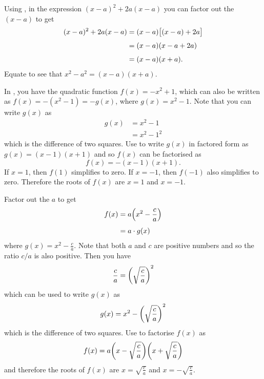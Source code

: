 \documentclass[a4paper,oneside,12pt]{article}
\begin{document}
\begin{problem}
{\begin{solution}
Using , in
the expression $(x - a)^2 + 2a(x - a)$ you can factor out the
$(x - a)$ to get
\begin{equation}
\label{eqn:quadroots:difference_two_squares_factorised}
\begin{aligned}
(x - a)^2 + 2a(x - a)
&=
(x - a) \bigsquare{(x - a) + 2a} \\[4pt]
&=
(x - a) (x - a + 2a) \\[4pt]
&=
(x - a) (x + a).
\end{aligned}
\end{equation}
Equate
to see that $x^2 - a^2 = (x - a) (x + a)$.

In , you have the
quadratic function $f(x) = -x^2 + 1$, which can also be written as
$f(x) = -(x^2 - 1) = -g(x)$, where $g(x) = x^2 - 1$.  Note that you
can write $g(x)$ as
\begin{align*}
g(x)
&=
x^2 - 1 \\[4pt]
&=
x^2 - 1^2
\end{align*}
which is the difference of two squares.
Use  to write
$g(x)$ in factored form as $g(x) = (x - 1) (x + 1)$ and so $f(x)$ can
be factorised as
\[
f(x)
=
-(x - 1) (x + 1).
\]
If $x = 1$, then $f(1)$ simplifies to zero.  If $x = -1$, then $f(-1)$
also simplifies to zero.  Therefore the roots of $f(x)$ are $x = 1$
and $x = -1$.

Factor out the $a$ to get
\begin{align*}
f(x)
&=
a
\parenthesis*{
  x^2 - \frac{c}{a}
} \\[4pt]
&=
a \cdot g(x)
\end{align*}
where $g(x) = x^2 - \frac{c}{a}$.  Note that both $a$ and $c$ are
positive numbers and so the ratio $c / a$ is also positive.  Then you
have
\[
\frac{c}{a}
=
\parenthesis*{
  \sqrt{
    \frac{c}{a}
  }
}^2
\]
which can be used to write $g(x)$ as
\[
g(x)
=
x^2
-
\parenthesis*{
  \sqrt{
    \frac{c}{a}
  }
}^2
\]
which is the difference of two squares.
Use  to
factorise $f(x)$ as
\[
f(x)
=
a
\parenthesis*{
  x - \sqrt{\frac{c}{a}}
}
\parenthesis*{
  x + \sqrt{\frac{c}{a}}
}
\]
and therefore the roots of $f(x)$ are $x = \sqrt{\frac{c}{a}}$ and
$x = -\sqrt{\frac{c}{a}}$.
\end{solution}
}{}


\end{problem}
\end{document}
